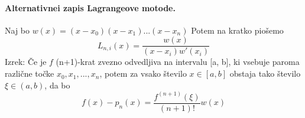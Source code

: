 \documentclass[a4paper]{article}
\begin{document}
\paragraph{Alternativnei zapis Lagrangeove motode.} Naj bo $w(x) = (x-x_0)(x-x_1)...(x-x_n)$ Potem na kratko piošemo $$L_{n, i}(x) = \frac{w(x)}{(x-x_i)w'(x_i)}$$
Izrek: Če je $f$ (n+1)-krat zvezno odvedljiva na intervalu [a, b], ki vsebuje paroma različne točke $x_0, x_1, ..., x_n$, potem za vsako število $x\in[a, b]$ obstaja tako število $\xi \in (a, b)$, da bo
$$f(x) - p_n(x) = \frac{f^{(n+1)}(\xi)}{(n+1)!}w(x)$$
\end{document}
